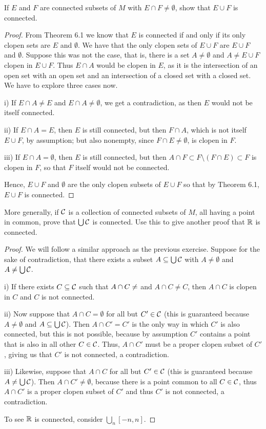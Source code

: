 \begin{exercise}{5}
If $E$ and $F$ are connected subsets of $M$ with $E\cap F \neq \emptyset$, show that $E\cup F$ is connected.
\end{exercise}
\begin{proof}
From Theorem 6.1 we know that $E$ is connected if and only if its only clopen sets are $E$ and $\emptyset$.
We have that the only clopen sets of $E\cup F$ are $E\cup F$ and $\emptyset$.
Suppose this was not the case, that is, there is a set $A\neq\emptyset$ and $A\neq E\cup F$ clopen in $E\cup F$.
Thus $E\cap A$ would be clopen in $E$, as it is the intersection of an open set with an open set and an intersection of a closed set with a closed set.
We have to explore three cases now. 

i) If $E \cap A \neq E$ and $E\cap A\neq \emptyset$, we get a contradiction, as then $E$ would not be itself connected.

ii) If $E \cap A = E$, then $E$ is still connected, but then $F\cap A$, which is not itself $E\cup F$, by assumption; but also nonempty, since $F\cap E\neq \emptyset$, is clopen in $F$.

iii) If $E\cap A = \emptyset$, then $E$ is still connected, but then $A\cap F \subset F\setminus(F\cap E)\subset F$ is clopen in $F$, so that $F$ itself would not be connected.

Hence, $E\cup F$ and $\emptyset$ are the only clopen subsets of $E\cup F$ so that by Theorem 6.1, $E\cup F$ is connected.
\end{proof} 

\begin{exercise}{6}
More generally, if $\mathcal{C}$ is a collection of connected subsets of $M$, all having a point in common, prove that $\bigcup\mathcal{C}$ is connected.
Use this to give another proof that $\mathbb{R}$ is connected.
\end{exercise}
\begin{proof}
We will follow a similar approach as the previous exercise.
Suppose for the sake of contradiction, that there exists a subset $A\subseteq\bigcup\mathcal{C}$ with $A\neq\emptyset$ and $A\neq\bigcup\mathcal{C}$.

i) If there exists $C\subseteq\mathcal{C}$ such that $A\cap C\neq \empty$ and $A\cap C\neq C$, then $A\cap C$ is clopen in $C$ and $C$ is not connected.

ii) Now suppose that $A\cap C=\emptyset$ for all but $C'\in\mathcal{C}$ (this is guaranteed because $A\neq\emptyset$ and $A\subseteq\bigcup\mathcal{C}$).
Then $A\cap C'=C'$ is the only way in which $C'$ is also connected, but this is not possible, because by assumption $C'$ contains a point that is also in all other $C\in\mathcal{C}$.
Thus, $A\cap C'$ must be a proper clopen subset of $C'$, giving us that $C'$ is not connected, a contradiction.

iii) Likewise, suppose that $A\cap C$ for all but $C'\in\mathcal{C}$ (this is guaranteed because $A\neq\bigcup\mathcal{C}$).
Then $A\cap C'\neq\emptyset$, because there is a point common to all $C\in\mathcal{C}$, thus $A\cap C'$ is a proper clopen subset of $C'$ and thus $C'$ is not connected, a contradiction.

To see $\mathbb{R}$ is connected, consider $\bigcup_n [-n,n]$.
\end{proof} 

